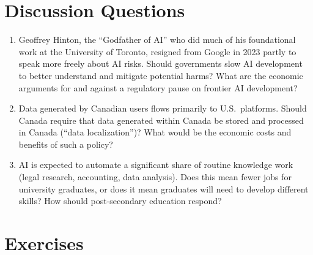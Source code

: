 \section*{Discussion Questions}

\begin{enumerate}

\item Geoffrey Hinton, the ``Godfather of AI'' who did much of his foundational work at the University of Toronto, resigned from Google in 2023 partly to speak more freely about AI risks. Should governments slow AI development to better understand and mitigate potential harms? What are the economic arguments for and against a regulatory pause on frontier AI development?

\item Data generated by Canadian users flows primarily to U.S.\ platforms. Should Canada require that data generated within Canada be stored and processed in Canada (``data localization'')? What would be the economic costs and benefits of such a policy?

\item AI is expected to automate a significant share of routine knowledge work (legal research, accounting, data analysis). Does this mean fewer jobs for university graduates, or does it mean graduates will need to develop different skills? How should post-secondary education respond?

\end{enumerate}

\section*{Exercises}

